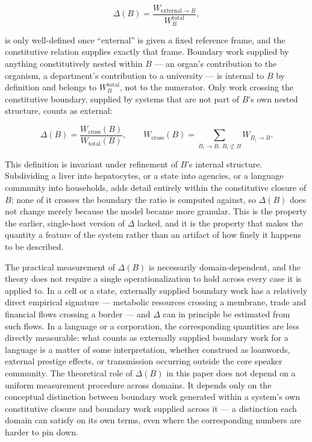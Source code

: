 \documentclass[11pt]{article}
\theoremstyle{plain}
\begin{document}
\[\Delta(B) = \frac{W_{\mathrm{external} \to B}}{W_B^{\mathrm{total}}},\]

is only well-defined once ``external'' is given a fixed reference frame, and the constitutive relation supplies exactly that frame. Boundary work supplied by anything constitutively nested within \(B\) --- an organ's contribution to the organism, a department's contribution to a university --- is internal to \(B\) by definition and belongs to \(W_B^{\mathrm{total}}\), not to the numerator. Only work crossing the constitutive boundary, supplied by systems that are not part of \(B\)'s own nested structure, counts as external:

\[\Delta(B) = \frac{W_{\mathrm{cross}}(B)}{W_{\mathrm{total}}(B)}, \qquad W_{\mathrm{cross}}(B) = \sum_{B_i \to B,\ B_i \not\subset B} W_{B_i \to B}.\]

This definition is invariant under refinement of \(B\)'s internal structure. Subdividing a liver into hepatocytes, or a state into agencies, or a language community into households, adds detail entirely within the constitutive closure of \(B\); none of it crosses the boundary the ratio is computed against, so \(\Delta(B)\) does not change merely because the model became more granular. This is the property the earlier, single-host version of \(\Delta\) lacked, and it is the property that makes the quantity a feature of the system rather than an artifact of how finely it happens to be described.

The practical measurement of \(\Delta(B)\) is necessarily domain-dependent, and the theory does not require a single operationalization to hold across every case it is applied to. In a cell or a state, externally supplied boundary work has a relatively direct empirical signature --- metabolic resources crossing a membrane, trade and financial flows crossing a border --- and \(\Delta\) can in principle be estimated from such flows. In a language or a corporation, the corresponding quantities are less directly measurable: what counts as externally supplied boundary work for a language is a matter of some interpretation, whether construed as loanwords, external prestige effects, or transmission occurring outside the core speaker community. The theoretical role of \(\Delta(B)\) in this paper does not depend on a uniform measurement procedure across domains. It depends only on the conceptual distinction between boundary work generated within a system's own constitutive closure and boundary work supplied across it --- a distinction each domain can satisfy on its own terms, even where the corresponding numbers are harder to pin down.
\end{document}
